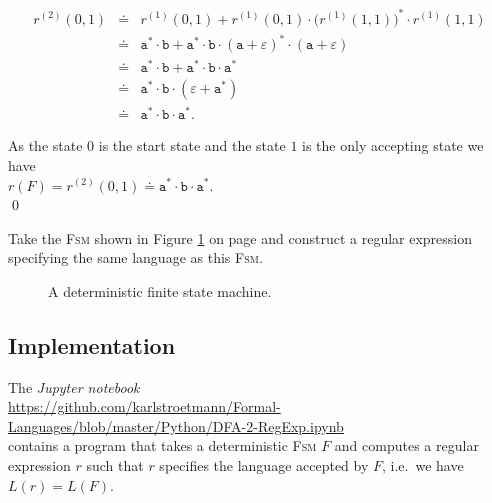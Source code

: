\begin{enumerate}
            \begin{eqnarray*}
                  r^{(2)}(0, 1)
            & \doteq & r^{(1)}(0, 1) + 
                  r^{(1)}(0, 1) \cdot \bigl(r^{(1)}(1, 1)\bigr)^* \cdot r^{(1)}(1, 1) \\
            & \doteq & \texttt{a}^* \cdot \texttt{b} + 
                  \texttt{a}^* \cdot \texttt{b} \cdot (\texttt{a} + \varepsilon)^* \cdot (\texttt{a} + \varepsilon) \\
            & \doteq & \texttt{a}^* \cdot \texttt{b} + \texttt{a}^* \cdot \texttt{b} \cdot \texttt{a}^* \\
            & \doteq & \texttt{a}^* \cdot \texttt{b} \cdot (\varepsilon + \texttt{a}^*) \\
            & \doteq & \texttt{a}^* \cdot \texttt{b} \cdot \texttt{a}^*.
        \end{eqnarray*}
\end{enumerate}
As the state 0 is the start state and the state $1$ is the only accepting state we have
\\[0.2cm]
\hspace*{1.3cm}
$r(F) = r^{(2)}(0, 1) \doteq \texttt{a}^* \cdot \texttt{b} \cdot \texttt{a}^*$.
\\[0.2cm]
\qed

\exerciseEng
Take the \textsc{Fsm} shown in Figure \ref{fig:exercise-13.eps} on page
\pageref{fig:exercise-13.eps} and construct a regular expression specifying the same language as this
\textsc{Fsm}.

\begin{figure}[!ht]
  \centering
{}
\caption{A deterministic finite state machine.}
\label{fig:exercise-13.eps}
\end{figure}

\subsection{Implementation}
The \textsl{Jupyter notebook} 
\\[0.2cm]
\hspace*{1.3cm}
\href{https://github.com/karlstroetmann/Formal-Languages/blob/master/Python/DFA-2-RegExp.ipynb}{https://github.com/karlstroetmann/Formal-Languages/blob/master/Python/DFA-2-RegExp.ipynb}
\\[0.2cm]
contains a program that takes a deterministic \textsc{Fsm} $F$ and computes a regular expression $r$ such that
$r$ specifies the language accepted by $F$, i.e.~we have $L(r) = L(F)$.


